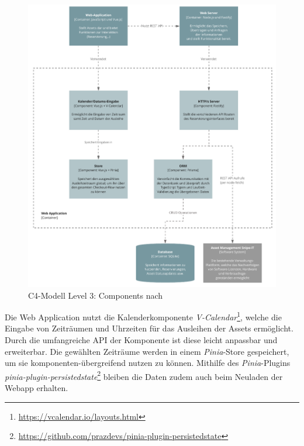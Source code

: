 \begin{figure}[h]
    \centering
    \includegraphics[scale=0.9]{Bilder/C4_3.pdf}
    \caption[C4-Modell Level 3: Components]{C4-Modell Level 3: Components nach }
    \label{fig:level3}
\end{figure}

Die Web Application nutzt die Kalenderkomponente
\textit{V-Calendar}\footnote{\url{https://vcalendar.io/layouts.html}}, welche die Eingabe von
Zeiträumen und Uhrzeiten für das Ausleihen der Assets ermöglicht. Durch die umfangreiche API der
Komponente ist diese leicht anpassbar und erweiterbar. Die gewählten Zeiträume werden in einem
\textit{Pinia}-Store gespeichert, um sie komponenten-übergreifend nutzen zu können. Mithilfe des
\textit{Pinia}-Plugins
\textit{pinia-plugin-persistedstate}\footnote{\url{https://github.com/prazdevs/pinia-plugin-persistedstate}}
bleiben die Daten zudem auch beim Neuladen der Webapp erhalten.



